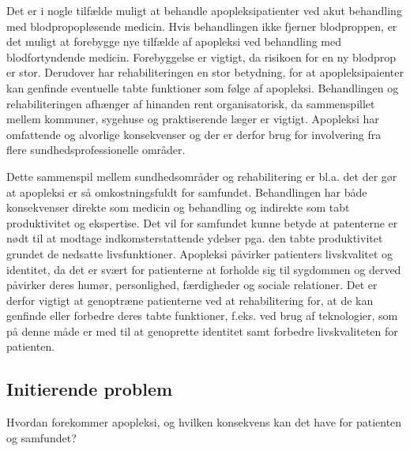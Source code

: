 Det er i nogle tilfælde muligt at behandle apopleksipatienter ved akut behandling med blodpropopløsende medicin. Hvis behandlingen ikke fjerner blodproppen, er det muligt at forebygge nye tilfælde af apopleksi ved behandling med blodfortyndende medicin.\cite{Hjerteforeningen2014} \cite{Kruuse2014a} Forebyggelse er vigtigt, da risikoen for en ny blodprop er stor. Derudover har rehabiliteringen en stor betydning, for at apopleksipaienter kan genfinde eventuelle tabte funktioner som følge af apopleksi.\cite{Kjaergaard2015} Behandlingen og rehabiliteringen afhænger af hinanden rent organisatorisk, da sammenspillet mellem kommuner, sygehuse og praktiserende læger er vigtigt. Apopleksi har omfattende og alvorlige konsekvenser og der er derfor brug for involvering fra flere sundhedsprofessionelle områder.\cite{Sundhedsstyrelsen2010}

Dette sammenspil mellem sundhedsområder og rehabilitering er bl.a. det der gør at apopleksi er så omkostningsfuldt for samfundet. Behandlingen har både konsekvenser direkte som medicin og behandling og indirekte som tabt produktivitet og ekspertise. Det vil for samfundet kunne betyde at patenterne er nødt til at modtage indkomsterstattende ydelser pga. den tabte produktivitet grundet de nedsatte livsfunktioner.\cite{Sundhedsstyrelsen2010} 
Apopleksi påvirker patienters livskvalitet og identitet, da det er svært for patienterne at forholde sig til sygdommen og derved påvirker deres humør, personlighed, færdigheder og sociale relationer. Det er derfor vigtigt at genoptræne patienterne ved at rehabilitering for, at de kan genfinde eller forbedre deres tabte funktioner, f.eks. ved brug af teknologier, som på denne måde er med til at genoprette identitet samt forbedre livskvaliteten for patienten.\cite{Sundhedsstyrelsen2010}  

\subsection{Initierende problem}
Hvordan forekommer apopleksi, og hvilken konsekvens kan det have for patienten og samfundet?